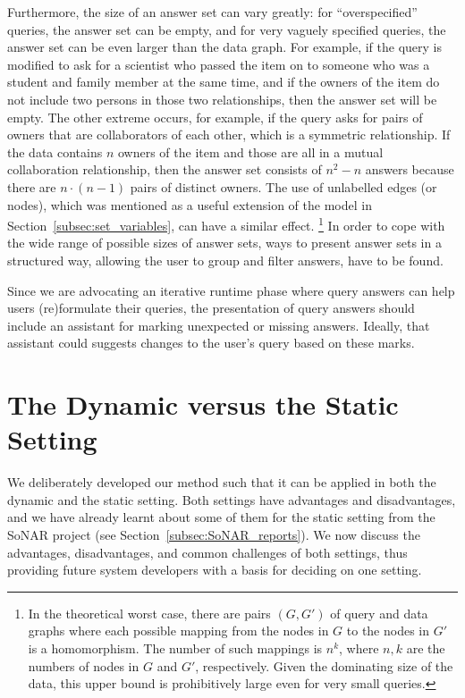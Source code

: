 \enlargethispage*{5mm}
Furthermore, the size of an answer set can vary greatly: for \enquote{overspecified} queries, the answer set can be empty,
and for very vaguely specified queries, the answer set can be even larger than the data graph.
For example, if the query  is modified to ask for a scientist who passed the item on
to someone who was a student and family member at the same time, and if the owners of the item
do not include two persons in those two relationships, then the answer set will be empty.
The other extreme occurs, for example, if the query asks for pairs of owners that are collaborators of each other,
which is a symmetric relationship. If the data contains $n$ owners of the item and those are all in a mutual collaboration relationship,
then the answer set consists of $n^2 - n$ answers because there are $n \cdot (n-1)$ pairs of distinct owners.
The use of unlabelled edges (or nodes), which was mentioned as a useful extension of the model in Section~\ref{subsec:set_variables},
can have a similar effect.%
\footnote{%
  In the theoretical worst case, there are pairs $(G,G')$ of query and data graphs
  where each possible mapping from the nodes in $G$
  to the nodes in $G'$ is a homomorphism. The number of such mappings is $n^k$,
  where $n,k$ are the numbers of nodes in $G$ and $G'$, respectively.
  Given the dominating size of the data, this upper bound is prohibitively large even for very small queries.%
}
In order to cope with the wide range of possible sizes of answer sets,
ways to present answer sets in a structured way,
allowing the user to group and filter answers, have to be found.

Since we are advocating an iterative runtime phase where query answers can help users (re)for\-mu\-late their queries,
the presentation of query answers should include an assistant for marking unexpected or missing answers.
Ideally, that assistant could suggests changes to the user's query based on these marks.

\section{The Dynamic versus the Static Setting}
\label{sec:dynamic_vs_static}

We deliberately developed our method such that it can be applied
in both the dynamic and the static setting.
Both settings have advantages and disadvantages,
and we have already learnt about some of them for the static setting
from the SoNAR project (see Section~\ref{subsec:SoNAR_reports}).
We now discuss the advantages, disadvantages, and common challenges of both settings,
thus providing future system developers with a basis for deciding on one setting.

